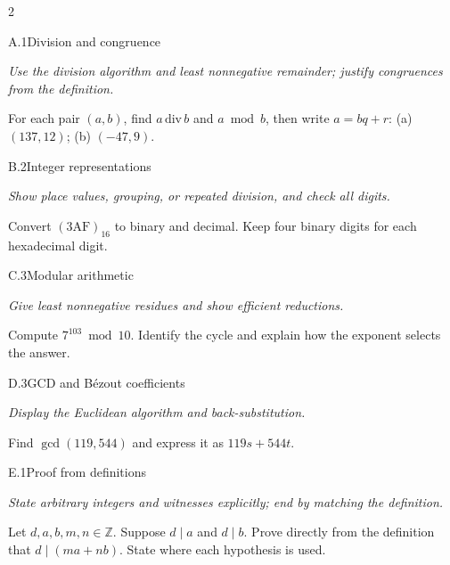 \documentclass[9pt]{extarticle}
\begin{document}
\begin{multicols}{2}
\begin{CoreProblem}{A.1}{Division and congruence}
{\scriptsize\textit{Use the division algorithm and least nonnegative remainder; justify congruences from the definition.}\par}
For each pair $(a,b)$, find $a\,\mathrm{div}\,b$ and $a\bmod b$, then write
$a=bq+r$: (a) $(137,12)$; (b) $(-47,9)$.
\end{CoreProblem}
\begin{CoreProblem}{B.2}{Integer representations}
{\scriptsize\textit{Show place values, grouping, or repeated division, and check all digits.}\par}
Convert $(\mathrm{3AF})_{16}$ to binary and decimal. Keep four binary digits
for each hexadecimal digit.
\end{CoreProblem}
\begin{CoreProblem}{C.3}{Modular arithmetic}
{\scriptsize\textit{Give least nonnegative residues and show efficient reductions.}\par}
Compute $7^{103}\bmod10$. Identify the cycle and explain how the exponent
selects the answer.
\end{CoreProblem}
\columnbreak
\begin{CoreProblem}{D.3}{GCD and B\'ezout coefficients}
{\scriptsize\textit{Display the Euclidean algorithm and back-substitution.}\par}
Find $\gcd(119,544)$ and express it as $119s+544t$.
\end{CoreProblem}
\begin{CoreProblem}{E.1}{Proof from definitions}
{\scriptsize\textit{State arbitrary integers and witnesses explicitly; end by matching the definition.}\par}
Let $d,a,b,m,n\in\mathbb Z$. Suppose $d\mid a$ and $d\mid b$. Prove directly
from the definition that $d\mid(ma+nb)$. State where each hypothesis is used.
\end{CoreProblem}
\end{multicols}
\CoreWorkArea
\FormBreak
{}
\end{document}
